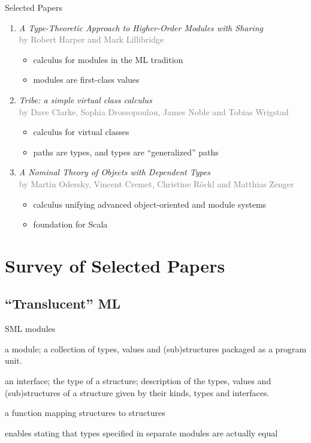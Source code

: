 \documentclass{beamer}
\begin{document}
\begin{frame}{Selected Papers}
\begin{enumerate}
\item {\it A Type-Theoretic Approach to Higher-Order
  Modules with Sharing}\\{\footnotesize\textcolor{gray}{by Robert Harper and Mark
  Lillibridge}}\begin{itemize}
\item calculus for modules in the ML tradition
\item modules are first-class values
\end{itemize}
\item {\it Tribe: a simple virtual class calculus}\\
  {\footnotesize\textcolor{gray}{by Dave Clarke, Sophia Drossopoulou, James Noble and Tobias Wrigstad}}\begin{itemize}
\item calculus for virtual classes
\item paths are types, and types are ``generalized'' paths
\end{itemize}
\item {\it A Nominal Theory of Objects with Dependent
  Types}\\{\footnotesize\textcolor{gray}{by Martin Odersky, Vincent Cremet, Christine R{\"o}ckl and
  Matthias Zenger}}\begin{itemize}
\item calculus unifying advanced object-oriented and module systems
\item foundation for Scala
\end{itemize}
\end{enumerate}
\end{frame}

\section{Survey of Selected Papers}

\subsection{``Translucent'' ML}

\begin{frame}{SML modules}
\begin{description}[structure]
\item[structure] a module; a collection of types, values and
  (sub)structures packaged as a program unit.
\item[signature] an interface; the type of a structure; description of
  the types, values and (sub)structures of a structure given by their
  kinds, types and interfaces.
\item[functor] a function mapping structures to structures
\item[type-sharing] enables stating that types specified in separate
  modules are actually equal
\end{description}
\end{frame}
\end{document}
